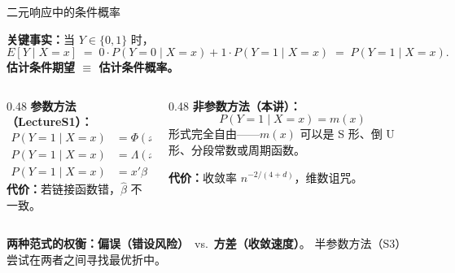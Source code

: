 \documentclass[aspectratio=169, 10pt]{beamer}
\begin{document}
\begin{frame}{二元响应中的条件概率}

  \begin{keybox}
    \textbf{关键事实：}当 $Y\in\{0,1\}$ 时，
    \[
      E[Y\mid X=x] \;=\; 0\cdot P(Y=0\mid X=x) + 1\cdot P(Y=1\mid X=x) \;=\; P(Y=1\mid X=x).
    \]
    \textbf{估计条件期望 $\equiv$ 估计条件概率。}
  \end{keybox}

  \vspace{0.3em}

  \begin{columns}[T]
    \begin{column}{0.48\textwidth}
      \textbf{参数方法（LectureS1）：}
      \begin{align*}
        P(Y=1\mid X=x) &= \Phi(x'\beta) &\text{Probit}\\
        P(Y=1\mid X=x) &= \Lambda(x'\beta) &\text{Logit}\\
        P(Y=1\mid X=x) &= x'\beta &\text{LPM}
      \end{align*}
      \textbf{代价：}若链接函数错，$\hat\beta$ 不一致。
    \end{column}
    \begin{column}{0.48\textwidth}
      \textbf{非参数方法（本讲）：}
      \[
        P(Y=1\mid X=x) = m(x)
      \]
      形式完全自由——$m(x)$ 可以是 S 形、倒 U 形、分段常数或周期函数。

      \vspace{0.3em}
      \textbf{代价：}收敛率 $n^{-2/(4+d)}$，维数诅咒。
    \end{column}
  \end{columns}

  \begin{highlightbox}
    \textbf{两种范式的权衡：}\textbf{偏误（错设风险）} \,vs.\, \textbf{方差（收敛速度）}。
    半参数方法（S3）尝试在两者之间寻找最优折中。
  \end{highlightbox}

\end{frame}
\end{document}
